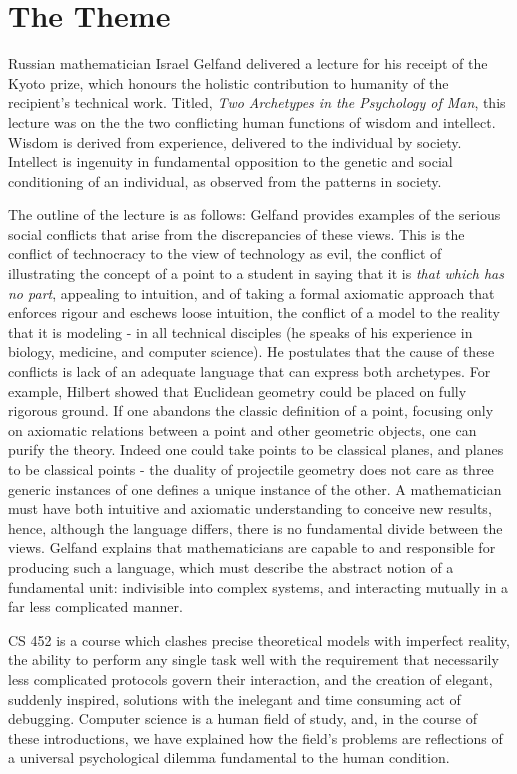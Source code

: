 \documentclass{amsart}
\begin{document}
\section*{The Theme}

Russian mathematician Israel Gelfand delivered a lecture for his receipt of the Kyoto prize, which honours the holistic contribution to humanity of the recipient's technical work. Titled, \textit{Two Archetypes in the Psychology of Man}, this lecture was on the the two conflicting human functions of wisdom and intellect. Wisdom is derived from experience, delivered to the individual by society. Intellect is ingenuity in fundamental opposition to the genetic and social conditioning of an individual, as observed from the patterns in society.

The outline of the lecture is as follows: Gelfand provides examples of the serious social conflicts that arise from the discrepancies of these views. This is the conflict of technocracy to the view of technology as evil, the conflict of illustrating the concept of a point to a student in saying that it is \textit{that which has no part}, appealing to intuition, and of taking a formal axiomatic approach that enforces rigour and eschews loose intuition, the conflict of a model to the reality that it is modeling - in all technical disciples (he speaks of his experience in biology, medicine, and computer science). He postulates that the cause of these conflicts is lack of an adequate language that can express both archetypes. For example, Hilbert showed that Euclidean geometry could be placed on fully rigorous ground. If one abandons the classic definition of a point, focusing only on axiomatic relations between a point and other geometric objects, one can purify the theory. Indeed one could take points to be classical planes, and planes to be classical points - the duality of projectile geometry does not care as three generic instances of one defines a unique instance of the other. A mathematician must have both intuitive and axiomatic understanding to conceive new results, hence, although the language differs, there is no fundamental divide between the views. Gelfand explains that mathematicians are capable to and responsible for producing such a language, which must describe the abstract notion of a fundamental unit: indivisible into complex systems, and interacting mutually in a far less complicated manner.

CS 452 is a course which clashes precise theoretical models with imperfect reality, the ability to perform any single task well with the requirement that necessarily less complicated protocols govern their interaction, and the creation of elegant, suddenly inspired, solutions with the inelegant and time consuming act of debugging. Computer science is a human field of study, and, in the course of these introductions, we have explained how the field's problems are reflections of a universal psychological dilemma fundamental to the human condition.
\end{document}
